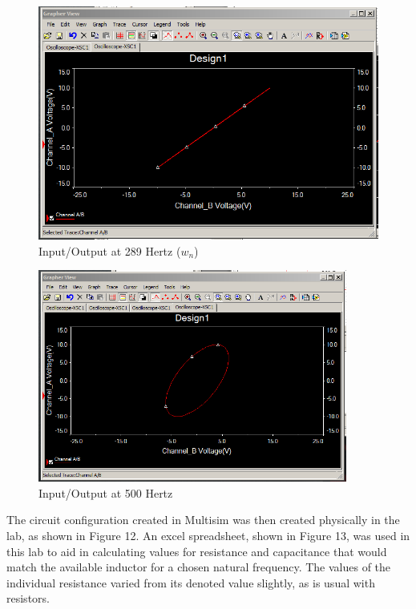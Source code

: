 \documentclass[12pt]{article}
\begin{document}
\begin{figure}[h!] %
   \centering
   \includegraphics[width=5in]{289hz_ab.PNG} 
   \caption{Input/Output at 289 Hertz ($w_{n}$)}
   \label{fig:example}
\end{figure}

\newpage

\begin{figure}[h!] %
   \centering
   \includegraphics[width=4in]{500hz_ab.PNG} 
   \caption{Input/Output at 500 Hertz}
   \label{fig:example}
\end{figure}
\bigskip

The circuit configuration created in Multisim was then created physically in the lab, as shown in Figure 12. An excel spreadsheet, shown in Figure 13, was used in this lab to aid in calculating values for resistance and capacitance that would match the available inductor for a chosen natural frequency. The values of the individual resistance varied from its denoted value slightly, as is usual with resistors.\bigskip
\end{document}
